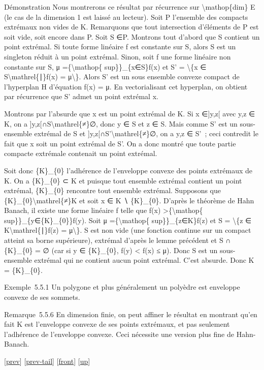 \documentclass[]{article}
\begin{document}
Démonstration Nous montrerons ce résultat par récurrence sur
\textbackslash{}mathop\{dim\} E (le cas de la dimension 1 est laissé au
lecteur). Soit P l'ensemble des compacts extrémaux non vides de K.
Remarquons que tout intersection d'éléments de P est soit vide, soit
encore dans P. Soit S ∈P. Montrons tout d'abord que S contient un point
extrémal. Si toute forme linéaire f est constante sur S, alors S est un
singleton réduit à un point extrémal. Sinon, soit f une forme linéaire
non constante sur S, μ =\{\textbackslash{}mathop\{ sup\}\}\_\{x∈S\}f(x)
et S' = \textbackslash{}\{x ∈ S\textbackslash{}mathrel\{∣\}f(x) =
μ\textbackslash{}\}. Alors S' est un sous ensemble convexe compact de
l'hyperplan H d'équation f(x) = μ. En vectorialisant cet hyperplan, on
obtient par récurrence que S' admet un point extrémal x.

Montrons par l'absurde que x est un point extrémal de K. Si x ∈{]}y,z{[}
avec y,z ∈ K, on a {]}y,z{[}∩S\textbackslash{}mathrel\{≠\}∅, donc y ∈ S
et z ∈ S. Mais comme S' est un sous-ensemble extrémal de S et
{]}y,z{[}∩S'\textbackslash{}mathrel\{≠\}∅, on a y,z ∈ S'~; ceci
contredit le fait que x soit un point extrémal de S'. On a donc montré
que toute partie compacte extrémale contenait un point extrémal.

Soit donc \{K\}\_\{0\} l'adhérence de l'enveloppe convexe des points
extrémaux de K. On a \{K\}\_\{0\} ⊂ K et puisque tout ensemble extrémal
contient un point extrémal, \{K\}\_\{0\} rencontre tout ensemble
extrémal. Supposons que \{K\}\_\{0\}\textbackslash{}mathrel\{≠\}K et
soit x ∈ K ∖ \{K\}\_\{0\}. D'après le théorème de Hahn Banach, il existe
une forme linéaire f telle que f(x)
\textgreater{}\{\textbackslash{}mathop\{
sup\}\}\_\{y∈\{K\}\_\{0\}\}f(y). Soit μ =\{\textbackslash{}mathop\{
sup\}\}\_\{z∈K\}f(z) et S = \textbackslash{}\{z ∈
K\textbackslash{}mathrel\{∣\}f(z) = μ\textbackslash{}\}. S est non vide
(une fonction continue sur un compact atteint sa borne supérieure),
extrémal d'après le lemme précédent et S ∩ \{K\}\_\{0\} = ∅ (car si y ∈
\{K\}\_\{0\}, f(y) \textless{} f(x) ≤ μ). Donc S est un sous-ensemble
extrémal qui ne contient aucun point extrémal. C'est absurde. Donc K =
\{K\}\_\{0\}.

Exemple~5.5.1 Un polygone et plus généralement un polyèdre est enveloppe
convexe de ses sommets.

Remarque~5.5.6 En dimension finie, on peut affiner le résultat en
montrant qu'en fait K est l'enveloppe convexe de ses points extrémaux,
et pas seulement l'adhérence de l'enveloppe convexe. Ceci nécessite une
version plus fine de Hahn-Banach.

{[}\href{coursse30.html}{prev}{]}
{[}\href{coursse30.html\#tailcoursse30.html}{prev-tail}{]}
{[}\href{coursse31.html}{front}{]}
{[}\href{coursch6.html\#coursse31.html}{up}{]}
\end{document}
